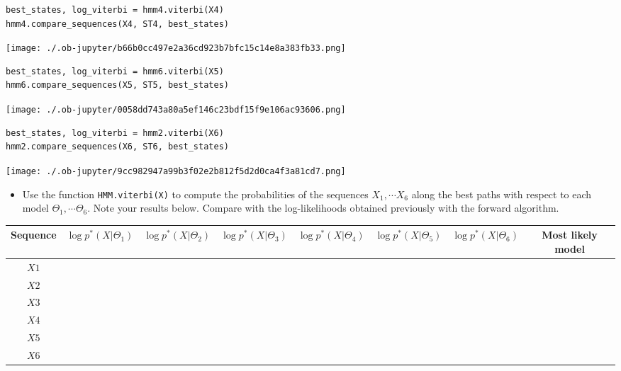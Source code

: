 \documentclass[11pt]{article}
\begin{document}
\begin{verbatim}
best_states, log_viterbi = hmm4.viterbi(X4)
hmm4.compare_sequences(X4, ST4, best_states)
\end{verbatim}

\begin{center}
\texttt{[image: ./.ob-jupyter/b66b0cc497e2a36cd923b7bfc15c14e8a383fb33.png]}
\end{center}

\begin{verbatim}
best_states, log_viterbi = hmm6.viterbi(X5)
hmm6.compare_sequences(X5, ST5, best_states)
\end{verbatim}

\begin{center}
\texttt{[image: ./.ob-jupyter/0058dd743a80a5ef146c23bdf15f9e106ac93606.png]}
\end{center}

\begin{verbatim}
best_states, log_viterbi = hmm2.viterbi(X6)
hmm2.compare_sequences(X6, ST6, best_states)
\end{verbatim}

\begin{center}
\texttt{[image: ./.ob-jupyter/9cc982947a99b3f02e2b812f5d2d0ca4f3a81cd7.png]}
\end{center}

\begin{itemize}
\item Use the function \texttt{HMM.viterbi(X)} to compute the probabilities of the
sequences \(X_1, \cdots X_6\) along the best paths with respect to each
model \(\Theta_1, \cdots \Theta_6\). Note your results below. Compare
with the log-likelihoods obtained previously with the forward algorithm.
\end{itemize}

\begin{center}
\footnotesize
\begin{tabular}{|c|c|c|c|c|c|c|c|}
Sequence & \(\log p^*(X\vert\Theta_1)\) & \(\log p^*(X\vert\Theta_2)\) & \(\log p^*(X\vert\Theta_3)\) & \(\log p^*(X\vert\Theta_4)\) & \(\log p^*(X\vert\Theta_5)\) & \(\log p^*(X\vert\Theta_6)\) & Most likely model\\
\hline
\(X1\) &  &  &  &  &  &  & \\
\(X2\) &  &  &  &  &  &  & \\
\(X3\) &  &  &  &  &  &  & \\
\(X4\) &  &  &  &  &  &  & \\
\(X5\) &  &  &  &  &  &  & \\
\(X6\) &  &  &  &  &  &  & \\
\end{tabular}
\end{center}
\end{document}
